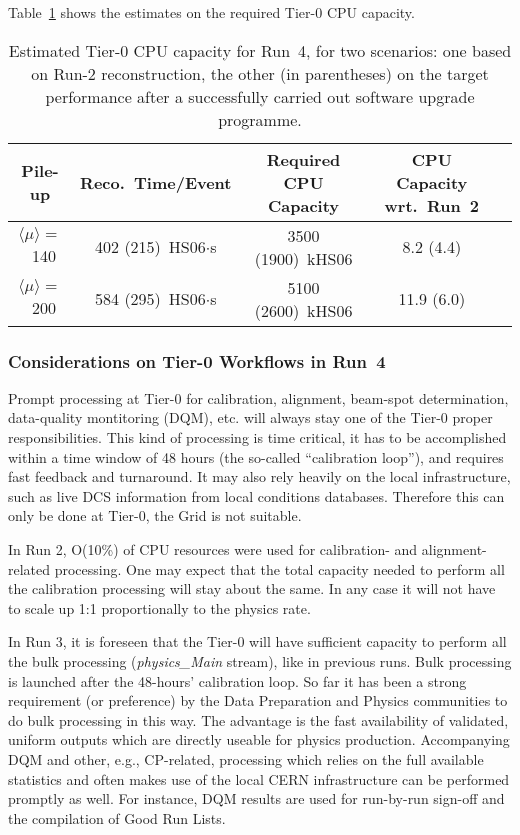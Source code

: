 Table~\ref{tab:tier0_cpu} shows the estimates on the required Tier-0 CPU capacity.

\begin{table}[htb!]
\begin{center}
  \begin{tabular}{|c|c|c|c|c|}
    \hline
    {\bf Pile-up}             & {\bf Reco.\ Time/Event} & {\bf Required CPU Capacity} & {\bf CPU Capacity wrt.\ Run~2} \\\hline\hline
    $\langle\mu\rangle =$~140 & 402 (215)~HS06$\cdot$s  & 3500 (1900)~kHS06           & \phantom{1}8.2 (4.4)           \\\hline
    $\langle\mu\rangle =$~200 & 584 (295)~HS06$\cdot$s  & 5100 (2600)~kHS06           & 11.9 (6.0)                     \\\hline
  \end{tabular}
\end{center} 
\caption{Estimated Tier-0 CPU capacity for Run~4, for two scenarios: one based on Run-2 reconstruction, the other (in parentheses) on the target performance after a successfully carried out software upgrade programme.}
\label{tab:tier0_cpu}
\end{table}


\subsubsection{Considerations on Tier-0 Workflows in Run~4}
\label{sec:tier0_workflows}

Prompt processing at Tier-0 for calibration, alignment, beam-spot determination, data-quality montitoring (DQM), etc. will always stay one of the Tier-0 proper responsibilities. This kind of processing is time critical, it has to be accomplished within a time window of 48 hours (the so-called ``calibration loop''), and requires fast feedback and turnaround. It may also rely heavily on the local infrastructure, such as live DCS information from local conditions databases. Therefore this can only be done at Tier-0, the Grid is not suitable. 

In Run 2, O(10\%) of CPU resources were used for calibration- and alignment-related processing. One may expect that the total capacity needed to perform all the calibration processing will stay about the same. In any case it will not have to scale up 1:1 proportionally to the physics rate.   

In Run 3, it is foreseen that the Tier-0 will have sufficient capacity to perform all the bulk processing ({\it physics\_Main} stream), like in previous runs. Bulk processing is launched after the 48-hours' calibration loop. So far it has been a strong requirement (or preference) by the Data Preparation and Physics communities to do bulk processing in this way. The advantage is the fast availability of validated, uniform outputs which are directly useable for physics production. Accompanying DQM and other, e.g., CP-related, processing which relies on the full available statistics and often makes use of the local CERN infrastructure can be performed promptly as well. For instance, DQM results are used for run-by-run sign-off and the compilation of Good Run Lists. 

